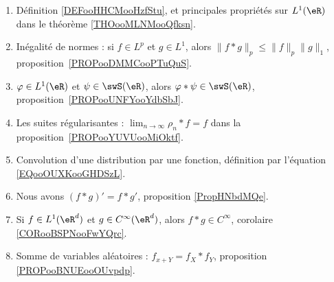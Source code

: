 	\label{THEMEooConvolution}
\begin{enumerate}
	\item
	      Définition \ref{DEFooHHCMooHzfStu}, et principales propriétés sur \( L^1(\eR)\) dans le théorème \ref{THOooMLNMooQfksn}.
	\item
	      Inégalité de normes : si \( f\in L^p\) et \( g\in L^1\), alors \( \| f*g \|_p\leq \| f \|_p\| g \|_1\), proposition~\ref{PROPooDMMCooPTuQuS}.
	\item
	      \( \varphi\in L^1(\eR)\) et \( \psi\in\swS(\eR)\), alors \( \varphi * \psi\in \swS(\eR)\), proposition~\ref{PROPooUNFYooYdbSbJ}.
	\item
	      Les suites régularisantes : \( \lim_{n\to \infty} \rho_n*f=f\) dans la proposition~\ref{PROPooYUVUooMiOktf}.
	\item
	      Convolution d'une distribution par une fonction, définition par l'équation \eqref{EQooOUXKooGHDSzL}.
	\item
	      Nous avons \( (f*g)'=f*g'\), proposition \ref{PropHNbdMQe}.
	\item
              Si \( f\in L^1(\eR^d)\) et \( g\in C^{\infty}(\eR^d)\), alors \( f*g\in C^{\infty}\), corolaire \ref{CORooBSPNooFwYQrc}.
	\item
	      Somme de variables aléatoires : \( f_{x+Y}=f_X*f_Y\), proposition \ref{PROPooBNUEooOUvpdp}.
\end{enumerate}
